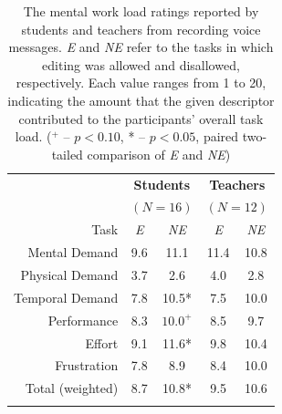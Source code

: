 \begin{table}
	\centering
	\begin{tabular}{r c c c c}
		& \multicolumn{2}{c}{\textbf{Students}} & \multicolumn{2}{c}{\textbf{Teachers}}\\
		& \multicolumn{2}{c}{$(N=16)$} & \multicolumn{2}{c}{$(N=12)$}\\
		\toprule
		Task			& \textit{E} & \textit{NE} & \textit{E} & \textit{NE}\\
		Mental Demand   & 9.6 & 11.1  & 11.4 & 10.8 \\
		Physical Demand & 3.7 & 2.6   & 4.0  & 2.8  \\
		Temporal Demand & 7.8 & 10.5*  & 7.5  & 10.0 \\
		Performance     & 8.3 & $10.0^+$  & 8.5  & 9.7  \\
		Effort          & 9.1 & 11.6*  & 9.8  & 10.4 \\
		Frustration     & 7.8 & 8.9   & 8.4  & 10.0 \\
		\midrule
		Total (weighted)& 8.7 & 10.8* & 9.5  & 10.6 \\
		\bottomrule \\
	\end{tabular}
	\caption{The mental work load ratings reported by students and teachers from recording voice messages. \textit{E} and \textit{NE} refer to the tasks in which editing was allowed and disallowed, respectively. Each value ranges from 1 to 20, indicating the amount that the given descriptor contributed to the participants' overall task load. ($^+$ -- $p<0.10$, * -- $p<0.05$, paired two-tailed comparison of \textit{E} and \textit{NE})}~\label{tab:table1}
\end{table}

